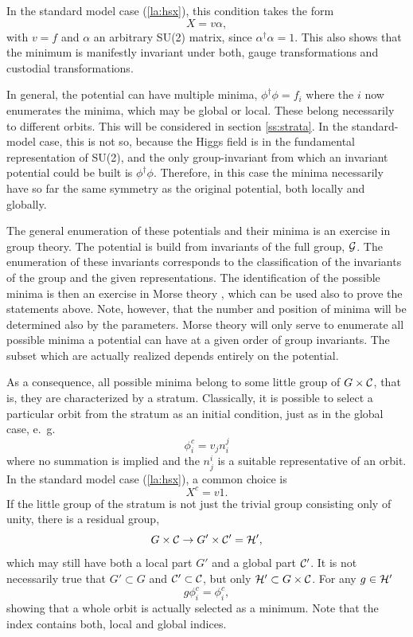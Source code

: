\documentclass[final,12pt,3p,longtitle]{elsarticle}
\newcommand*{\no}{\noindent}
\newcommand*{\be}{\begin{equation}}
\newcommand*{\ee}{\end{equation}}
\newcommand*{\pref}[1]{(\ref{#1})}
\newcommand*{\nn}{\nonumber}
\newcommand*{\1}{1\!\!\!\bot}
\begin{document}
In the standard model case \pref{la:hsx}, this condition takes the form
\be
X=v\alpha\nn,
\ee
\no with $v=f$ and $\alpha$ an arbitrary SU(2) matrix, since $\alpha^\dagger\alpha=1$. This also shows that the minimum is manifestly invariant under both, gauge transformations and custodial transformations.

In general, the potential can have multiple minima, $\phi^\dagger\phi=f_i$ where the $i$ now enumerates the minima, which may be global or local. These belong necessarily to different orbits. This will be considered in section \ref{ss:strata}. In the standard-model case, this is not so, because the Higgs field is in the fundamental representation of SU(2), and the only group-invariant from which an invariant potential could be built is $\phi^\dagger\phi$. Therefore, in this case the minima necessarily have so far the same symmetry as the original potential, both locally and globally.

The general enumeration of these potentials and their minima is an exercise in group theory. The potential is build from invariants of the full group, ${\cal G}$. The enumeration of these invariants corresponds to the classification of the invariants of the group and the given representations. The identification of the possible minima is then an exercise in Morse theory \cite{O'Raifeartaigh:1986vq,Sartori:1992ib}, which can be used also to prove the statements above. Note, however, that the number and position of minima will be determined also by the parameters. Morse theory will only serve to enumerate all possible minima a potential can have at a given order of group invariants. The subset which are actually realized depends entirely on the potential.

As a consequence, all possible minima belong to some little group of $G\times{\cal C}$, that is, they are characterized by a stratum. Classically, it is possible to select a particular orbit from the stratum as an initial condition, just as in the global case, e.\ g.\
\be
\phi_i^c=v_jn_i^j\nn
\ee
\no where no summation is implied and the $n^i_j$ is a suitable representative of an orbit. In the standard model case \pref{la:hsx}, a common choice is
\be
X^c=v1\nn.
\ee
\no If the little group of the stratum is not just the trivial group consisting only of unity, there is a residual group,
\be
G\times{\cal C}\to G'\times{\cal C'}={\cal H}'\nn,
\ee
\no which may still have both a local part $G'$ and a global part ${\cal C}'$. It is not necessarily true that $G'\subset G$ and ${\cal C}'\subset{\cal C}$, but only ${\cal H}'\subset G \times{\cal C}$. For any $g\in{\cal H}'$
\be
g\phi_i^c=\phi_i^c\nn,
\ee
\no showing that a whole orbit is actually selected as a minimum. Note that the index contains both, local and global indices.
\end{document}
